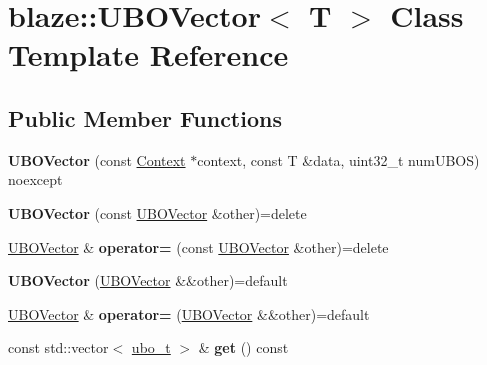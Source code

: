 \hypertarget{classblaze_1_1UBOVector}{}\section{blaze\+:\+:U\+B\+O\+Vector$<$ T $>$ Class Template Reference}
\label{classblaze_1_1UBOVector}
\subsection*{Public Member Functions}
\begin{DoxyCompactItemize}
\item 
\mbox{\label{classblaze_1_1UBOVector_a2eab32788ac1e58fe5f8da02ff720ec5}} 
{\bfseries U\+B\+O\+Vector} (const \hyperlink{classblaze_1_1Context}{Context} $\ast$context, const T \&data, uint32\+\_\+t num\+U\+B\+OS) noexcept
\item 
\mbox{\label{classblaze_1_1UBOVector_aa2e1f83f1117b16e4777a203fa85a19a}} 
{\bfseries U\+B\+O\+Vector} (const \hyperlink{classblaze_1_1UBOVector}{U\+B\+O\+Vector} \&other)=delete
\item 
\mbox{\label{classblaze_1_1UBOVector_a25dcb4540c299af68e90e6562e638041}} 
\hyperlink{classblaze_1_1UBOVector}{U\+B\+O\+Vector} \& {\bfseries operator=} (const \hyperlink{classblaze_1_1UBOVector}{U\+B\+O\+Vector} \&other)=delete
\item 
\mbox{\label{classblaze_1_1UBOVector_af7c08e3af27268ed39c1427610e92321}} 
{\bfseries U\+B\+O\+Vector} (\hyperlink{classblaze_1_1UBOVector}{U\+B\+O\+Vector} \&\&other)=default
\item 
\mbox{\label{classblaze_1_1UBOVector_a3bdcee2bc412621221a82818fb00f665}} 
\hyperlink{classblaze_1_1UBOVector}{U\+B\+O\+Vector} \& {\bfseries operator=} (\hyperlink{classblaze_1_1UBOVector}{U\+B\+O\+Vector} \&\&other)=default
\item 
\mbox{\label{classblaze_1_1UBOVector_aac87cae072ad7e35efe420426906282d}} 
const std\+::vector$<$ \hyperlink{classblaze_1_1UBO}{ubo\+\_\+t} $>$ \& {\bfseries get} () const
\item 

\end{DoxyCompactItemize}
